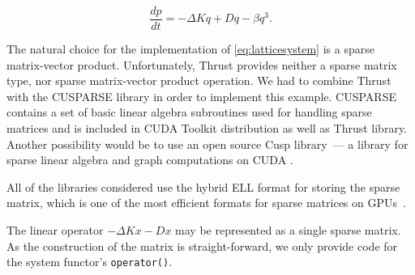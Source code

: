 \documentclass[1p]{elsarticle}
\newcommand{\code}[1]{\lstinline|#1|}
\newcommand {\de} {\mbox{d}}
\newcommand {\rem}[1]{}
\begin{document}
\rem{
Another example for our performance and usage study is a strongly
nonlinear disordered Hamiltonian lattice. Its equations of motion are
governed by
\begin{equation}
\frac{\de q_{i,j}}{\de t} = p_{i,j} \quad \text{,} \quad \quad \frac{\de
p_{i,j}}{\de t} = - \omega_{i,j}^2 q_i - \beta q_{i,j}^3 + \Delta_d q_{i,j}
\,\,\text{.}
\label{eq:disordered_ham}
\end{equation}
Here, $\Delta_d q_{i,j}$ denotes the two-dimensional discreet Laplacian
$\Delta_d
q_{i,j}=q_{i+1,j}+q_{i-1,j}+q_{i,j+1}+q_{i,j-1}-4q_{i,j}$. Such
systems are widely used in theoretical physics to study phenomena
like Anderson localization or thermalization.

An important property of \eqref{eq:disordered_ham} is its Hamiltonian
nature. It can be obtained from a Hamiltonian and the energy and phase
volume is conserved during its evolution. To account for these
properties, a special class of solvers exists, namely symplectic
solvers. Odeint implements three different variants of such solvers,
all are of the Runge-Kutta-Nystrom type.
}

\begin{equation} \label{eq:latticesystem}
    \frac{dp}{dt} = -\Delta Kq + Dq - \beta q^3.
\end{equation}

The natural choice for the implementation of \eqref{eq:latticesystem} is a
sparse matrix-vector product. Unfortunately, Thrust provides neither a sparse
matrix type, nor sparse matrix-vector product operation.  We had to combine
Thrust with the CUSPARSE library in order to implement this example. CUSPARSE
contains a set of basic linear algebra subroutines used for handling sparse
matrices and is included in CUDA Toolkit distribution as well as Thrust
library. Another possibility would be to use an open source Cusp library~--- a
library for sparse linear algebra and graph computations on CUDA
\cite{CuspRef}. 

All of the libraries considered use the hybrid
ELL format for storing the sparse matrix, which is one of the most efficient formats for sparse matrices on
GPUs~\cite{BellGarland2008}.

The linear operator $-\Delta Kx-Dx$ may be represented as a single sparse matrix.
As the construction of the matrix is straight-forward, we only provide code for the system functor's \code{operator()}.
\end{document}
